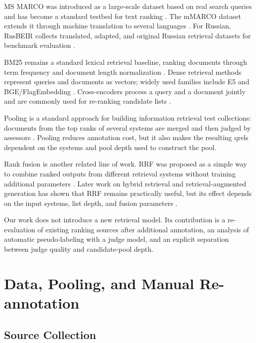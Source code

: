 \documentclass[runningheads,a4paper]{llncs}
\begin{document}
MS MARCO was introduced as a large-scale dataset based on real search queries and has become a standard testbed for text ranking \cite{bajaj2016msmarco}. The mMARCO dataset extends it through machine translation to several languages \cite{bonifacio2022mmarco}. For Russian, RusBEIR collects translated, adapted, and original Russian retrieval datasets for benchmark evaluation \cite{2025rusbeir}.

BM25 remains a standard lexical retrieval baseline, ranking documents through term frequency and document length normalization \cite{robertson2009bm25}. Dense retrieval methods represent queries and documents as vectors; widely used families include E5 \cite{wang2022e5} and BGE/FlagEmbedding \cite{xiao2023cpack}. Cross-encoders process a query and a document jointly and are commonly used for re-ranking candidate lists \cite{nogueira2019bert}.

Pooling is a standard approach for building information retrieval test collections: documents from the top ranks of several systems are merged and then judged by assessors \cite{voorhees2005trec}. Pooling reduces annotation cost, but it also makes the resulting qrels dependent on the systems and pool depth used to construct the pool.

Rank fusion is another related line of work. RRF was proposed as a simple way to combine ranked outputs from different retrieval systems without training additional parameters \cite{cormack2009rrf}. Later work on hybrid retrieval and retrieval-augmented generation has shown that RRF remains practically useful, but its effect depends on the input systems, list depth, and fusion parameters \cite{bruch2023fusion,mackenzie2023anserini,rackauckas2024ragfusion}.

Our work does not introduce a new retrieval model. Its contribution is a re-evaluation of existing ranking sources after additional annotation, an analysis of automatic pseudo-labeling with a judge model, and an explicit separation between judge quality and candidate-pool depth.

\section{Data, Pooling, and Manual Re-annotation}

\subsection{Source Collection}
\end{document}
